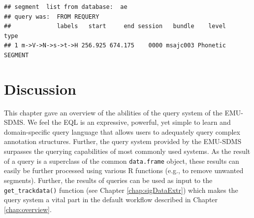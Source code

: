 \documentclass[]{book}
\begin{document}
\begin{verbatim}
## segment  list from database:  ae 
## query was:  FROM REQUERY 
##             labels   start     end session   bundle    level    type
## 1 m->V->N->s->t->H 256.925 674.175    0000 msajc003 Phonetic SEGMENT
\end{verbatim}

\hypertarget{discussion}{%
\section{Discussion}\label{discussion}}

This chapter gave an overview of the abilities of the query system of the EMU-SDMS. We feel the EQL is an expressive, powerful, yet simple to learn and domain-specific query language that allows users to adequately query complex annotation structures. Further, the query system provided by the EMU-SDMS surpasses the querying capabilities of most commonly used systems. As the result of a query is a superclass of the common \texttt{data.frame} object, these results can easily be further processed using various R functions (e.g., to remove unwanted segments). Further, the results of queries can be used as input to the \texttt{get\_trackdata()} function (see Chapter \ref{chap:sigDataExtr}) which makes the query system a vital part in the default workflow described in Chapter \ref{chap:overview}.
\end{document}
